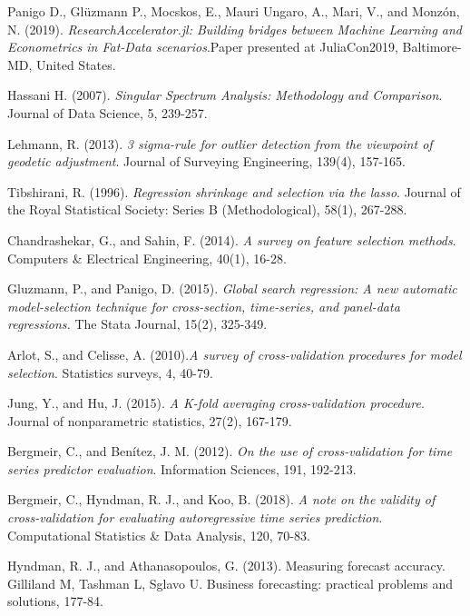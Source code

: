 \documentclass{article}
\begin{document}
  
\begin{thebibliography}{1}

Panigo D., Glüzmann P., Mocskos, E., Mauri Ungaro, A., Mari, V., and Monzón, N. (2019). \textit{ResearchAccelerator.jl: Building bridges between Machine Learning and Econometrics in Fat-Data scenarios}.Paper presented at JuliaCon2019, Baltimore-MD, United States.

Hassani H. (2007). \textit{Singular Spectrum Analysis: Methodology and Comparison}. Journal of Data Science, 5, 239-257.

Lehmann, R. (2013). \textit{3 sigma-rule for outlier detection from the viewpoint of geodetic adjustment}. Journal of Surveying Engineering, 139(4), 157-165.

Tibshirani, R. (1996). \textit{Regression shrinkage and selection via the lasso}. Journal of the Royal Statistical Society: Series B (Methodological), 58(1), 267-288.

Chandrashekar, G., and Sahin, F. (2014). \textit{A survey on feature selection methods}. Computers & Electrical Engineering, 40(1), 16-28.

Gluzmann, P., and Panigo, D. (2015). \textit{Global search regression: A new automatic model-selection technique for cross-section, time-series, and panel-data regressions.} The Stata Journal, 15(2), 325-349.

Arlot, S., and Celisse, A. (2010).\textit{A survey of cross-validation procedures for model selection}. Statistics surveys, 4, 40-79.

Jung, Y., and Hu, J. (2015). \textit{A K-fold averaging cross-validation procedure}. Journal of nonparametric statistics, 27(2), 167-179.

Bergmeir, C., and Benítez, J. M. (2012). \textit{On the use of cross-validation for time series predictor evaluation}. Information Sciences, 191, 192-213.

Bergmeir, C., Hyndman, R. J., and Koo, B. (2018). \textit{A note on the validity of cross-validation for evaluating autoregressive time series prediction}. Computational Statistics & Data Analysis, 120, 70-83.

Hyndman, R. J., and Athanasopoulos, G. (2013). Measuring forecast accuracy. Gilliland M, Tashman L, Sglavo U. Business forecasting: practical problems and solutions, 177-84.

\end{thebibliography}
\end{document}
